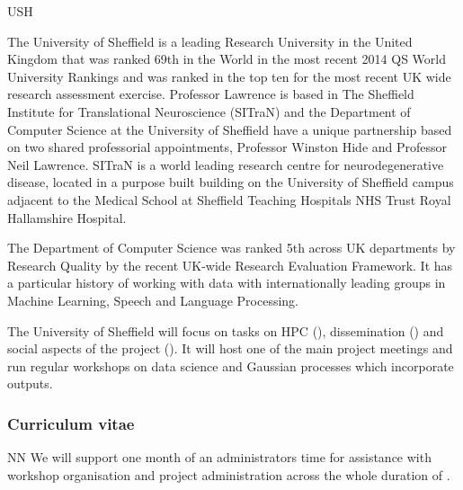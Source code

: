 \begin{sitedescription}{USH}



The University of Sheffield is a leading Research University in the
United Kingdom that was ranked 69th in the World in the most recent
2014 QS World University Rankings and was ranked in the top ten for
the most recent UK wide research assessment exercise.  Professor
Lawrence is based in The Sheffield Institute for Translational
Neuroscience (SITraN) and the Department of Computer Science at the
University of Sheffield have a unique partnership based on two shared
professorial appointments, Professor Winston Hide and Professor Neil
Lawrence.  SITraN is a world leading research centre for
neurodegenerative disease, located in a purpose built building on the
University of Sheffield campus adjacent to the Medical School at
Sheffield Teaching Hospitals NHS Trust Royal Hallamshire Hospital. 

The Department of Computer Science was ranked 5th across UK
departments by Research Quality by the recent UK-wide Research
Evaluation Framework. It has a particular history of working with data
with internationally leading groups in Machine Learning, Speech and
Language Processing.

The University of Sheffield will focus on tasks on HPC (),
dissemination () and social aspects of the project
(). It will host one of the main project meetings
and run regular workshops on data science and Gaussian processes which incorporate
\TheProject outputs.

\subsubsection*{Curriculum vitae}






\begin{participant}[type=res,PM=1]{NN}
  We will support one month of an administrators time for assistance
  with workshop organisation and project administration across the
  whole duration of \TheProject.
\end{participant}



\end{sitedescription}
